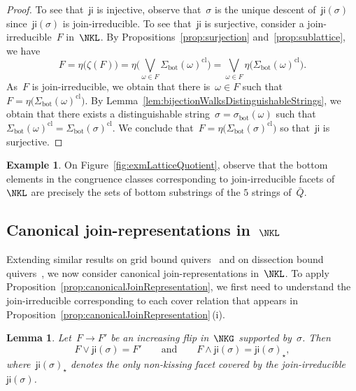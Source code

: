 \documentclass{memo-l}
\newtheorem{lemma}[theorem]{Lemma}
\theoremstyle{definition}
\newtheorem{example}[theorem]{Example}
\newcommand{\fref}[1]{Figure~\ref{#1}} %
\newcommand{\bottom}{\mathrm{bot}} %
\newcommand{\meet}{\wedge} %
\newcommand{\join}{\vee} %
\newcommand{\bigJoin}{\bigvee} %
\newcommand{\closure}[1]{#1^{\mathrm{cl}}} %
\newcommand{\ji}{\mathsf{ji}} %
\begin{document}
\begin{proof}
To see that~$\ji$ is injective, observe that~$\sigma$ is the unique descent of~$\ji(\sigma)$ since~$\ji(\sigma)$ is join-irreducible.
%
To see that~$\ji$ is surjective, consider a join-irreducible~$F$ in~$\NKL$.
By Propositions~\ref{prop:surjection} and~\ref{prop:sublattice}, we have
\[
F = \eta \big( \zeta(F) \big) = \eta \Big( \bigJoin_{\omega \in F} \closure{\Sigma_\bottom(\omega)} \Big) = \bigJoin_{\omega \in F} \eta \big( \closure{\Sigma_\bottom(\omega)} \big).
\]
As~$F$ is join-irreducible, we obtain that there is~$\omega \in F$ such that~${F = \eta \big( \closure{\Sigma_\bottom(\omega)} \big)}$.
By Lemma~\ref{lem:bijectionWalksDistinguishableStrings}, we obtain that there exists a distinguishable string~$\sigma = \sigma_\bottom(\omega)$ such that ${\closure{\Sigma_\bottom(\omega)} = \closure{\Sigma_\bottom(\sigma)}}$.
We conclude that~$F = \eta \big( \closure{\Sigma_\bottom(\sigma)} \big)$ so that~$\ji$ is surjective.
\end{proof}

\begin{example}
On \fref{fig:exmLatticeQuotient}, observe that the bottom elements in the congruence classes corresponding to join-irreducible facets of~$\NKL$ are precisely the sets of bottom substrings of the $5$ strings of~$\bar Q$.
\end{example}

\subsection{Canonical join-representations in~$\NKL$}

Extending similar results on grid bound quivers~\cite{GarverMcConville-grid} and on dissection bound quivers~\cite{GarverMcConville}, we now consider canonical join-represen\-tations in~$\NKL$.
To apply Proposition~\ref{prop:canonicalJoinRepresentation}, we first need to understand the join-irreducible corresponding to each cover relation that appears in  Proposition~\ref{prop:canonicalJoinRepresentation}\,(i).

\begin{lemma}
Let~$F \to F'$ be an increasing flip in~$\NKG$ supported by~$\sigma$. Then
\[
F \join \ji(\sigma) = F'
\qquad\text{and}\qquad
F \meet \ji(\sigma) = \ji(\sigma)_\star,
\]
where~$\ji(\sigma)_\star$ denotes the only non-kissing facet covered by the join-irreducible~$\ji(\sigma)$.
\end{lemma}
\end{document}
